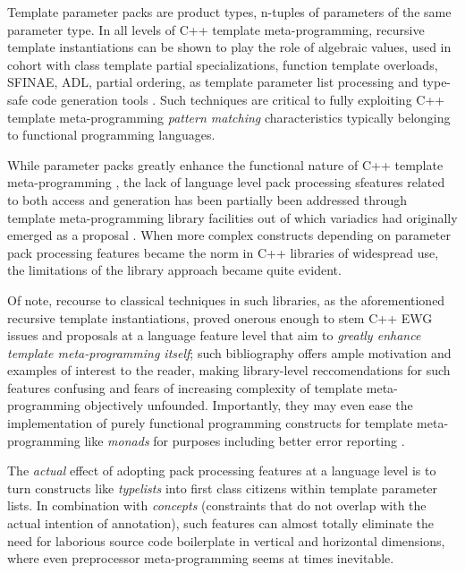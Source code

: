 \p Template parameter packs are product types, n-tuples of parameters of the same parameter type.
In all levels of C++ template meta-programming, recursive template instantiations can be shown to play the role of algebraic values, used in cohort with class template partial specializations, function template overloads, SFINAE, ADL, partial ordering, as template parameter list processing and type-safe code generation tools \cite{Munoz2008,JarviWL03,Abrahams2004,Alexandrescu2001}.
Such techniques are critical to fully exploiting C++ template meta-programming \textit{pattern matching} characteristics typically belonging to functional programming languages.

\p While parameter packs greatly enhance the functional nature of C++ template meta-programming \cite{Alexandrescu2012}, the lack of language level pack processing sfeatures related to both access and generation has been partially been addressed through template meta-programming library facilities out of which variadics had originally emerged as a proposal \cite{Czarnecki2000,Alexandrescu2001,Abrahams2004,Gregor2006,Gregor2008,Gregor2008a}.
When more complex constructs depending on parameter pack processing features became the norm in C++ libraries of widespread use, the limitations of the library approach became quite evident.

\p Of note, recourse to classical techniques in such libraries, as the aforementioned recursive template instantiations, proved onerous enough to stem C++ EWG issues and proposals at a language feature level \cite{Abrahams2012,Middleditch2013,Wakely2013,Wakely2013a} that aim to \textit{greatly enhance template meta-programming itself}; such bibliography offers ample motivation and examples of interest to the reader, making library-level reccomendations for such features confusing and fears of increasing complexity of template meta-programming objectively unfounded.
Importantly, they may even ease the implementation of purely functional programming constructs for template meta-programming like \textit{monads} \cite{Porkolab2010,Sinkovich2013} for purposes including better error reporting \cite{Sinkovich2013}.

\p The \textit{actual} effect of adopting pack processing features at a language level is to turn constructs like \textit{typelists} \cite{Czarnecki2000,Alexandrescu2001,Abrahams2004} into first class citizens within template parameter lists.
In combination with \textit{concepts} \cite{Stroustrup2012,Sutton2013} (constraints that do not overlap with the actual intention of annotation), such features can almost totally eliminate the need for laborious source code boilerplate in vertical and horizontal dimensions, where even preprocessor meta-programming seems at times inevitable.

